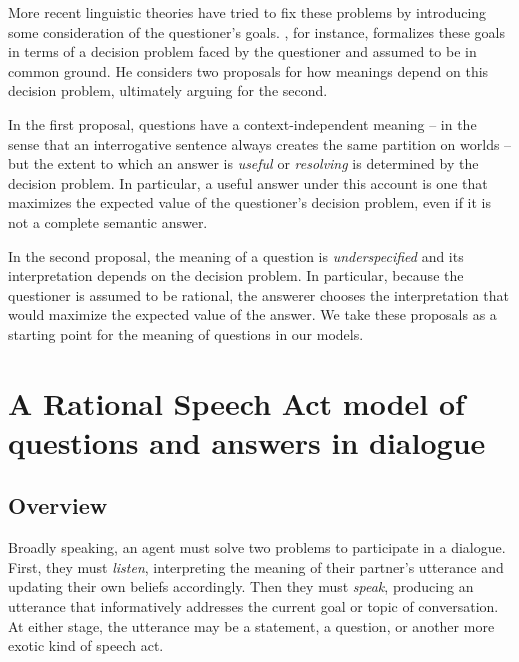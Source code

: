 \documentclass[12pt, floatsintext, jou]{apa6}
\begin{document}
More recent linguistic theories have tried to fix these problems by introducing some consideration of the questioner's goals. , for instance, formalizes these goals in terms of a decision problem faced by the questioner and assumed to be in common ground. He considers two proposals for how meanings depend on this decision problem, ultimately arguing for the second. 

In the first proposal, questions have a context-independent meaning -- in the sense that an interrogative sentence always creates the same partition on worlds -- but the extent to which an answer is \emph{useful} or \emph{resolving} is determined by the decision problem. In particular, a useful answer under this account is one that maximizes the expected value of the questioner's decision problem, even if it is not a complete semantic answer. 

In the second proposal, the meaning of a question is \emph{underspecified} and its interpretation depends on the decision problem. In particular, because the questioner is assumed to be rational, the answerer chooses the interpretation that would maximize the expected value of the answer. We take these proposals as a starting point for the meaning of questions in our models.

\section{A Rational Speech Act model of \\questions and answers in dialogue}

\subsection{Overview}

Broadly speaking, an agent must solve two problems to participate in a dialogue. 
First, they must \emph{listen}, interpreting the meaning of their partner's utterance and updating their own beliefs accordingly. 
Then they must \emph{speak}, producing an utterance that informatively addresses the current goal or topic of conversation. 
At either stage, the utterance may be a statement, a question, or another more exotic kind of speech act. 
\end{document}
